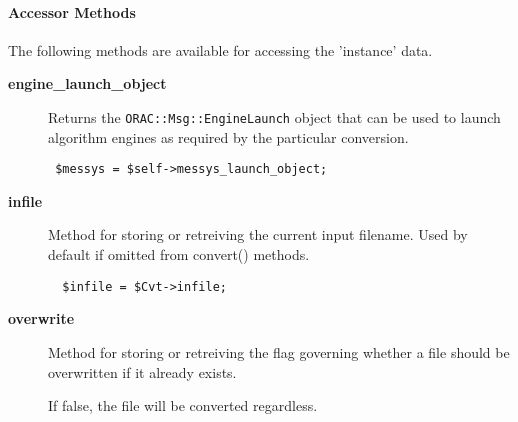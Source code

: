 \paragraph*{Accessor Methods\label{ORAC::Convert_Accessor_Methods}}


The following methods are available for accessing the
'instance' data.

\begin{description}

\item[{\textbf{engine\_launch\_object}}] \mbox{}

Returns the \texttt{ORAC::Msg::EngineLaunch} object that can be used
to launch algorithm engines as required by the particular
conversion.

\begin{verbatim}
 $messys = $self->messys_launch_object;
\end{verbatim}

\item[{\textbf{infile}}] \mbox{}

Method for storing or retreiving the current input filename.
Used by default if omitted from convert() methods.

\begin{verbatim}
  $infile = $Cvt->infile;
\end{verbatim}

\item[{\textbf{overwrite}}] \mbox{}

Method for storing or retreiving the flag governing whether
a file should be overwritten if it already exists.



If false, the file will be converted regardless.

\end{description}
